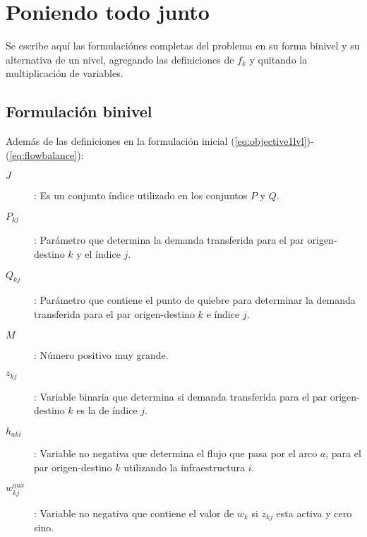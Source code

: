 \documentclass{article}
\begin{document}
  \section*{Poniendo todo junto}

  Se escribe aquí las formulaciónes completas del problema en su forma binivel y su alternativa de un nivel, agregando las definiciones de $f_k$ y quitando la multiplicación de variables.

  \subsection*{Formulación binivel}

  Además de las definiciones en la formulación inicial (\ref{eq:objective1lvl})-(\ref{eq:flowbalance}):

  \begin{description}
    \item[$J$]: Es un conjunto índice utilizado en los conjuntos $P$ y $Q$.
    \item[$P_{kj}$]: Parámetro que determina la demanda transferida para el par origen-destino $k$ y el índice $j$.
    \item[$Q_{kj}$]: Parámetro que contiene el punto de quiebre para determinar la demanda transferida para el par origen-destino $k$ e índice $j$.
    \item[$M$]: Número positivo muy grande. 
    \item[$z_{kj}$]: Variable binaria que determina si demanda transferida para el par origen-destino $k$ es la de índice $j$.
    \item[$h_{aki}$]: Variable no negativa que determina el flujo que pasa por el arco $a$, para el par origen-destino $k$ utilizando la infraestructura $i$.
    \item[$w^{aux}_{kj}$]: Variable no negativa que contiene el valor de $w_{k}$ si $z_{kj}$ esta activa y cero sino. 
  \end{description}
\end{document}

